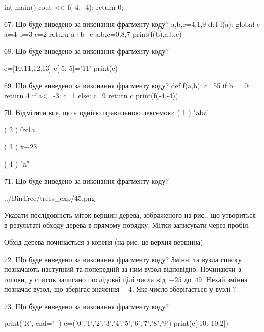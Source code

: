 \documentclass[11pt]{article}
\begin{document}
int main(){
    cout << f(-4, -4);
    return 0;
}


67. Що буде виведено за виконання фрагменту коду?
a,b,c=4,1,9
   def f(a):
     global c     a=4
     b=3
     c=2
     return a+b+c
   a,b,c=0,8,7
   print(f(b),a,b,c)

68. Що буде виведено за виконання фрагменту коду?

e=[10,11,12,13]
e[-5:-5]='11'
print(e)



69. Що буде виведено за виконання фрагменту коду?
def f(a,b):
      c=55
      if b==0: return 4
      if a<=-3: c=1
      else: c=9
      return c
   print(f(-4,-4))

70. %
Відмітити все, що є однією правильною лексемою:
( 1 ) "abc'

( 2 ) 0x1a

( 3 ) x+23

( 4 ) "a\na"


71. Що буде виведено за виконання фрагменту коду?

\begin{center}
	{../BinTree/trees_exp/45.png}
\end{center}
Указати послідовність міток вершин дерева, зображеного на рис., що утвориться в результаті обходу дерева в прямому порядку. Мітки записувати через пробіл.\par Обхід дерева починається з кореня (на рис. це верхня вершина).


72. Що буде виведено за виконання фрагменту коду?
Змінні  та  вузла списку позначають наступний та попередній за ним вузол відповідно. Починаючи з голови, у список записано послідовні цілі числа від~$-25$ до~$49$. Нехай змінна  позначає вузол, що зберігає значення~$-4$.
Яке число зберігається у вузлі  ?


73. Що буде виведено за виконання фрагменту коду?

print('R', end=' ')
e=('0','1','2','3','4','5','6','7','8','9')
print(e[-10:-10:2])


\end{document}
